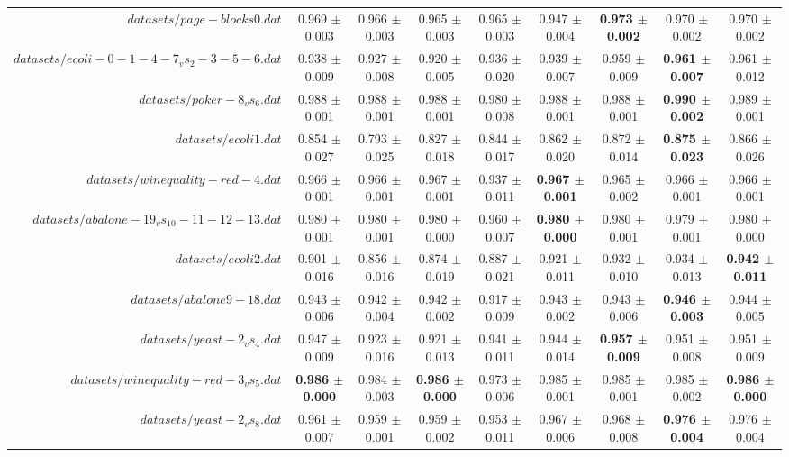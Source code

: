 \begin{table}[!ht]
{\begin{tabular}{r c c c c c c c c}
$datasets/page-blocks0.dat$ & 0.969 $\pm$ 0.003 & 0.966 $\pm$ 0.003 & 0.965 $\pm$ 0.003 & 0.965 $\pm$ 0.003 & 0.947 $\pm$ 0.004 & \textbf{0.973 $\pm$ 0.002} & 0.970 $\pm$ 0.002 & 0.970 $\pm$ 0.002 \\
$datasets/ecoli-0-1-4-7_vs_2-3-5-6.dat$ & 0.938 $\pm$ 0.009 & 0.927 $\pm$ 0.008 & 0.920 $\pm$ 0.005 & 0.936 $\pm$ 0.020 & 0.939 $\pm$ 0.007 & 0.959 $\pm$ 0.009 & \textbf{0.961 $\pm$ 0.007} & 0.961 $\pm$ 0.012 \\
$datasets/poker-8_vs_6.dat$ & 0.988 $\pm$ 0.001 & 0.988 $\pm$ 0.001 & 0.988 $\pm$ 0.001 & 0.980 $\pm$ 0.008 & 0.988 $\pm$ 0.001 & 0.988 $\pm$ 0.001 & \textbf{0.990 $\pm$ 0.002} & 0.989 $\pm$ 0.001 \\
$datasets/ecoli1.dat$ & 0.854 $\pm$ 0.027 & 0.793 $\pm$ 0.025 & 0.827 $\pm$ 0.018 & 0.844 $\pm$ 0.017 & 0.862 $\pm$ 0.020 & 0.872 $\pm$ 0.014 & \textbf{0.875 $\pm$ 0.023} & 0.866 $\pm$ 0.026 \\
$datasets/winequality-red-4.dat$ & 0.966 $\pm$ 0.001 & 0.966 $\pm$ 0.001 & 0.967 $\pm$ 0.001 & 0.937 $\pm$ 0.011 & \textbf{0.967 $\pm$ 0.001} & 0.965 $\pm$ 0.002 & 0.966 $\pm$ 0.001 & 0.966 $\pm$ 0.001 \\
$datasets/abalone-19_vs_10-11-12-13.dat$ & 0.980 $\pm$ 0.001 & 0.980 $\pm$ 0.001 & 0.980 $\pm$ 0.000 & 0.960 $\pm$ 0.007 & \textbf{0.980 $\pm$ 0.000} & 0.980 $\pm$ 0.001 & 0.979 $\pm$ 0.001 & 0.980 $\pm$ 0.000 \\
$datasets/ecoli2.dat$ & 0.901 $\pm$ 0.016 & 0.856 $\pm$ 0.016 & 0.874 $\pm$ 0.019 & 0.887 $\pm$ 0.021 & 0.921 $\pm$ 0.011 & 0.932 $\pm$ 0.010 & 0.934 $\pm$ 0.013 & \textbf{0.942 $\pm$ 0.011} \\
$datasets/abalone9-18.dat$ & 0.943 $\pm$ 0.006 & 0.942 $\pm$ 0.004 & 0.942 $\pm$ 0.002 & 0.917 $\pm$ 0.009 & 0.943 $\pm$ 0.002 & 0.943 $\pm$ 0.006 & \textbf{0.946 $\pm$ 0.003} & 0.944 $\pm$ 0.005 \\
$datasets/yeast-2_vs_4.dat$ & 0.947 $\pm$ 0.009 & 0.923 $\pm$ 0.016 & 0.921 $\pm$ 0.013 & 0.941 $\pm$ 0.011 & 0.944 $\pm$ 0.014 & \textbf{0.957 $\pm$ 0.009} & 0.951 $\pm$ 0.008 & 0.951 $\pm$ 0.009 \\
$datasets/winequality-red-3_vs_5.dat$ & \textbf{0.986 $\pm$ 0.000} & 0.984 $\pm$ 0.003 & \textbf{0.986 $\pm$ 0.000} & 0.973 $\pm$ 0.006 & 0.985 $\pm$ 0.001 & 0.985 $\pm$ 0.001 & 0.985 $\pm$ 0.002 & \textbf{0.986 $\pm$ 0.000} \\
$datasets/yeast-2_vs_8.dat$ & 0.961 $\pm$ 0.007 & 0.959 $\pm$ 0.001 & 0.959 $\pm$ 0.002 & 0.953 $\pm$ 0.011 & 0.967 $\pm$ 0.006 & 0.968 $\pm$ 0.008 & \textbf{0.976 $\pm$ 0.004} & 0.976 $\pm$ 0.004 \\

\end{tabular}}
\end{table}
